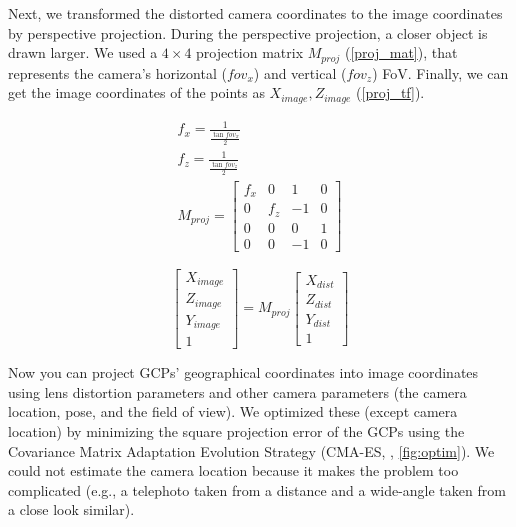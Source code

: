 \documentclass{article}
\begin{document}
Next, we transformed the distorted camera coordinates to the image coordinates by perspective projection. During the perspective projection, a closer object is drawn larger. We used a \(4 \times 4\) projection matrix \(M_{proj}\) (\ref{proj_mat}), that represents the camera's horizontal (\(fov_x\)) and vertical (\(fov_z\)) FoV. Finally, we can get the image coordinates of the points as \(X_{image}, Z_{image}\) (\ref{proj_tf}).

\label{proj_mat}
\begin{gather}
  f_x = \frac{1}{\frac{\tan fov_x}{2}} \\
  f_z = \frac{1}{\frac{\tan fov_z}{2}} \\
  M_{proj} = 
  \begin{bmatrix} 
    f_x & 0 & 1 & 0\\ 
    0 & f_z & -1 & 0 \\ 
    0 & 0 & 0 & 1\\ 
    0 & 0 & -1 & 0 
  \end{bmatrix}
\end{gather}

\label{proj_tf}
\begin{equation}
  \begin{bmatrix} 
    X_{image} \\ Z_{image} \\ Y_{image} \\ 1 
  \end{bmatrix}
  =
  M_{proj}
  \begin{bmatrix} 
    X_{dist} \\ Z_{dist} \\ Y_{dist} \\ 1 
  \end{bmatrix}
\end{equation}

Now you can project GCPs' geographical coordinates into image coordinates using lens distortion parameters and other camera parameters (the camera location, pose, and the field of view). We optimized these (except camera location) by minimizing the square projection error of the GCPs using the Covariance Matrix Adaptation Evolution Strategy (CMA-ES, \cite{Hansen2003CMAES}, \ref{fig:optim}). We could not estimate the camera location because it makes the problem too complicated (e.g., a telephoto taken from a distance and a wide-angle taken from a close look similar).
\end{document}
